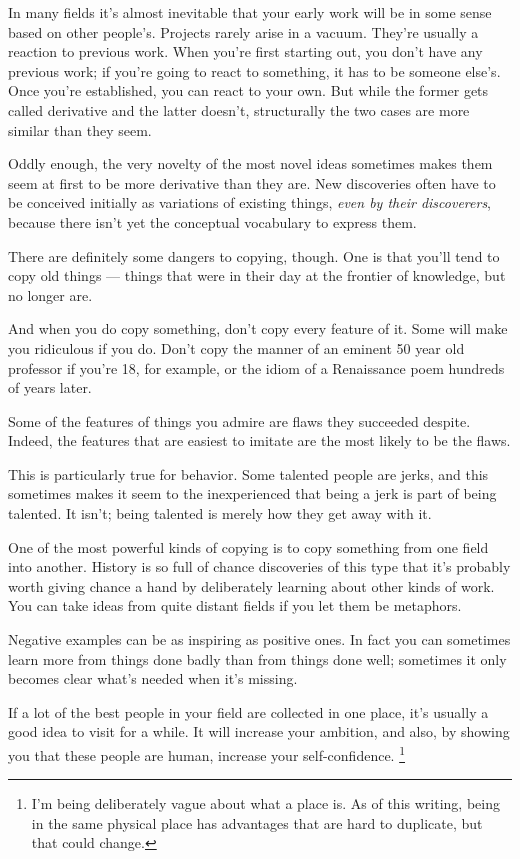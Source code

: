 \documentclass[12pt]{book}
\begin{document}
In many fields it's almost inevitable that your early work will be in
some sense based on other people's. Projects rarely arise in a vacuum.
They're usually a reaction to previous work. When you're first starting
out, you don't have any previous work; if you're going to react to
something, it has to be someone else's. Once you're established, you can
react to your own. But while the former gets called derivative and the
latter doesn't, structurally the two cases are more similar than they
seem.

Oddly enough, the very novelty of the most novel ideas sometimes makes
them seem at first to be more derivative than they are. New discoveries
often have to be conceived initially as variations of existing things,
\emph{even by their discoverers}, because there isn't yet the conceptual
vocabulary to express them.

There are definitely some dangers to copying, though. One is that you'll
tend to copy old things --- things that were in their day at the
frontier of knowledge, but no longer are.

And when you do copy something, don't copy every feature of it. Some
will make you ridiculous if you do. Don't copy the manner of an eminent
50 year old professor if you're 18, for example, or the idiom of a
Renaissance poem hundreds of years later.

Some of the features of things you admire are flaws they succeeded
despite. Indeed, the features that are easiest to imitate are the most
likely to be the flaws.

This is particularly true for behavior. Some talented people are jerks,
and this sometimes makes it seem to the inexperienced that being a jerk
is part of being talented. It isn't; being talented is merely how they
get away with it.

One of the most powerful kinds of copying is to copy something from one
field into another. History is so full of chance discoveries of this
type that it's probably worth giving chance a hand by deliberately
learning about other kinds of work. You can take ideas from quite
distant fields if you let them be metaphors.

Negative examples can be as inspiring as positive ones. In fact you can
sometimes learn more from things done badly than from things done well;
sometimes it only becomes clear what's needed when it's missing.

If a lot of the best people in your field are collected in one place,
it's usually a good idea to visit for a while. It will increase your
ambition, and also, by showing you that these people are human, increase
your self-confidence. \footnote{I'm being deliberately vague about what a place is. As of this
writing, being in the same physical place has advantages that are hard
to duplicate, but that could change.}
\end{document}
